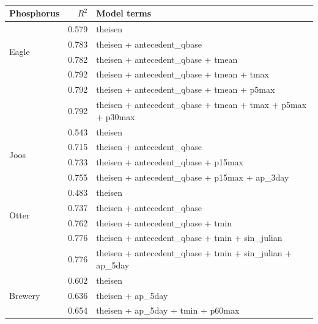 \documentclass[12pt]{article}
\begin{document}
\begin{table}[h]
\begin{center}
\begin{tabular}{lrl}
    \textbf{Phosphorus} & $R^2$ & Model terms \\
    \hline
    \multirow{4}{*}{Eagle} & 0.579 & theisen\\
    & 0.783 & theisen + antecedent\_qbase\\
    & 0.782 & theisen + antecedent\_qbase + tmean\\
    & 0.792 & theisen + antecedent\_qbase + tmean + tmax \\
    & 0.792 & theisen + antecedent\_qbase + tmean + p5max \\
    & 0.792 & theisen + antecedent\_qbase + tmean + tmax + p5max + p30max
    \vspace{2mm}\\
    \multirow{4}{*}{Joos} & 0.543 & theisen\\
    & 0.715 & theisen + antecedent\_qbase\\
    & 0.733 & theisen + antecedent\_qbase + p15max\\
    & 0.755 & theisen + antecedent\_qbase + p15max + ap\_3day
    \vspace{2mm}\\
    \multirow{4}{*}{Otter} & 0.483 & theisen\\
    & 0.737 & theisen + antecedent\_qbase\\
    & 0.762 & theisen + antecedent\_qbase + tmin\\
    & 0.776 & theisen + antecedent\_qbase + tmin + sin\_julian\\
    & 0.776 & theisen + antecedent\_qbase + tmin + sin\_julian + ap\_5day
    \vspace{2mm}\\
    \multirow{3}{*}{Brewery} & 0.602 & theisen\\
    & 0.636 & theisen + ap\_5day\\
    & 0.654 & theisen + ap\_5day + tmin + p60max\\

    \end{tabular}
    \caption{\label{r_square_nosnow}}
    \end{center}
\end{table}
\end{document}
